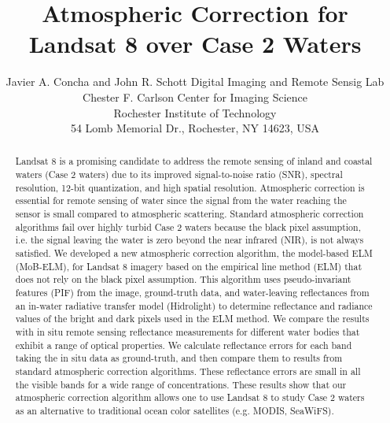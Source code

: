 \documentclass[draft]{spie}  %
\title{Atmospheric Correction for Landsat 8 over Case 2 Waters}
\author{Javier A. Concha and John R. Schott
\skiplinehalf
Digital Imaging and Remote Sensig Lab\\Chester F. Carlson Center for Imaging Science\\Rochester Institute of Technology\\ 54 Lomb Memorial Dr., Rochester, NY 14623, USA\\
}
\begin{document}
 
  \maketitle 

\begin{abstract}
Landsat 8 is a promising candidate to address the remote sensing of inland and coastal waters (Case 2 waters) due to its improved signal-to-noise ratio (SNR), spectral resolution, 12-bit quantization, and high spatial resolution. Atmospheric correction is essential for remote sensing of water since the signal from the water reaching the sensor is small compared to atmospheric scattering. Standard atmospheric correction algorithms fail over highly turbid Case 2 waters because the black pixel assumption, i.e. the signal leaving the water is zero beyond the near infrared (NIR), is not always satisfied. We developed a new atmospheric correction algorithm, the model-based ELM (MoB-ELM), for Landsat 8 imagery based on the empirical line method (ELM) that does not rely on the black pixel assumption. This algorithm uses pseudo-invariant features (PIF) from the image, ground-truth data, and water-leaving reflectances from an in-water radiative transfer model (Hidrolight) to determine reflectance and radiance values of the bright and dark pixels used in the ELM method.  We compare the results with in situ remote sensing reflectance measurements for different water bodies that exhibit a range of optical properties. We calculate reflectance errors for each band taking the in situ data as ground-truth, and then compare them to results from standard atmospheric correction algorithms. These reflectance errors are small in all the visible bands for a wide range of concentrations. These results show that our atmospheric correction algorithm allows one to use Landsat 8 to study Case 2 waters as an alternative to traditional ocean color satellites (e.g. MODIS, SeaWiFS). 
\end{abstract}



\end{document}
